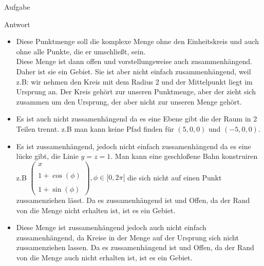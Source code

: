 \documentclass{scrartcl}
\begin{document}
\begin{section}{Aufgabe}
\begin{subsection}{Antwort}
\begin{itemize}
\item[b)] Diese Punktmenge soll die komplexe Menge ohne den Einheitskreis und auch ohne alle Punkte, die er umschließt, sein. \\
Diese Menge ist dann offen und vorstellungsweise auch zusammenhängend. Daher ist sie ein Gebiet. Sie ist aber nicht einfach zusammenhängend, weil z.B: wir nehmen den Kreis mit dem Radius 2 und der Mittelpunkt liegt im Ursprung an. Der Kreis gehört zur unseren Punktmenge, aber der zieht sich zusammen um den Ursprung, der aber nicht zur unseren Menge gehört.\\
\item[c)] Es ist auch nicht zussamenhängend da es eine Ebene gibt die der Raum in 2 Teilen trennt. z.B man kann keine Pfad finden für $(5,0,0)$ und $(-5,0,0)$.
\item[d)] Es ist zussamenhängend, jedoch nicht einfach zussamenhängend da es eine lücke gibt, die Linie $y=z=1$.
Man kann eine geschloßene Bahn konstruiren z.B $\left(
\begin{array}{c}
 x\\\\1+\cos(\phi)\\\\1+\sin(\phi)
\end{array}
\right),\phi\in[0,2\pi[$ die sich nicht auf einen Punkt zussamenziehen lässt.
Da es zussamenhängend ist und Offen, da der Rand von die Menge nicht erhalten ist, ist es ein Gebiet.
\item[e)] Diese Menge ist zussamenhängend jedoch auch nicht einfach zussamenhängend, da Kreise in der Menge auf der Ursprung sich nicht zussamenziehen lassen. 
Da es zussamenhängend ist und Offen, da der Rand von die Menge auch nicht erhalten ist, ist es ein Gebiet.
            \end{itemize}
    \end{subsection}  
\end{section}
\end{document}
